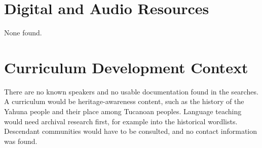\documentclass[12pt]{article}
\begin{document}
\section{Digital and Audio Resources}
None found.

\section{Curriculum Development Context}
There are no known speakers and no usable documentation found in the searches. A curriculum would be heritage-awareness content, such as the history of the Yahuna people and their place among Tucanoan peoples. Language teaching would need archival research first, for example into the historical wordlists. Descendant communities would have to be consulted, and no contact information was found.
\end{document}
